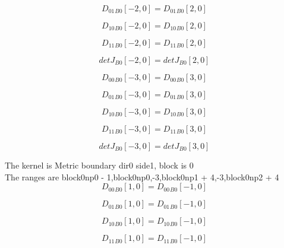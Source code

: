 \documentclass{article}
\begin{document}
\begin{dmath}{D_{01}{_{B0}}}[{-2,0}] = {D_{01}{_{B0}}}[{2,0}]\end{dmath}

\begin{dmath}{D_{10}{_{B0}}}[{-2,0}] = {D_{10}{_{B0}}}[{2,0}]\end{dmath}

\begin{dmath}{D_{11}{_{B0}}}[{-2,0}] = {D_{11}{_{B0}}}[{2,0}]\end{dmath}

\begin{dmath}{detJ{_{B0}}}[{-2,0}] = {detJ{_{B0}}}[{2,0}]\end{dmath}

\begin{dmath}{D_{00}{_{B0}}}[{-3,0}] = {D_{00}{_{B0}}}[{3,0}]\end{dmath}

\begin{dmath}{D_{01}{_{B0}}}[{-3,0}] = {D_{01}{_{B0}}}[{3,0}]\end{dmath}

\begin{dmath}{D_{10}{_{B0}}}[{-3,0}] = {D_{10}{_{B0}}}[{3,0}]\end{dmath}

\begin{dmath}{D_{11}{_{B0}}}[{-3,0}] = {D_{11}{_{B0}}}[{3,0}]\end{dmath}

\begin{dmath}{detJ{_{B0}}}[{-3,0}] = {detJ{_{B0}}}[{3,0}]\end{dmath}

\noindent The kernel is Metric boundary dir0 side1, block is 0\\\noindent The ranges are block0np0 - 1,block0np0,-3,block0np1 + 4,-3,block0np2 + 4\\\begin{dmath}{D_{00}{_{B0}}}[{1,0}] = {D_{00}{_{B0}}}[{-1,0}]\end{dmath}

\begin{dmath}{D_{01}{_{B0}}}[{1,0}] = {D_{01}{_{B0}}}[{-1,0}]\end{dmath}

\begin{dmath}{D_{10}{_{B0}}}[{1,0}] = {D_{10}{_{B0}}}[{-1,0}]\end{dmath}

\begin{dmath}{D_{11}{_{B0}}}[{1,0}] = {D_{11}{_{B0}}}[{-1,0}]\end{dmath}
\end{document}

